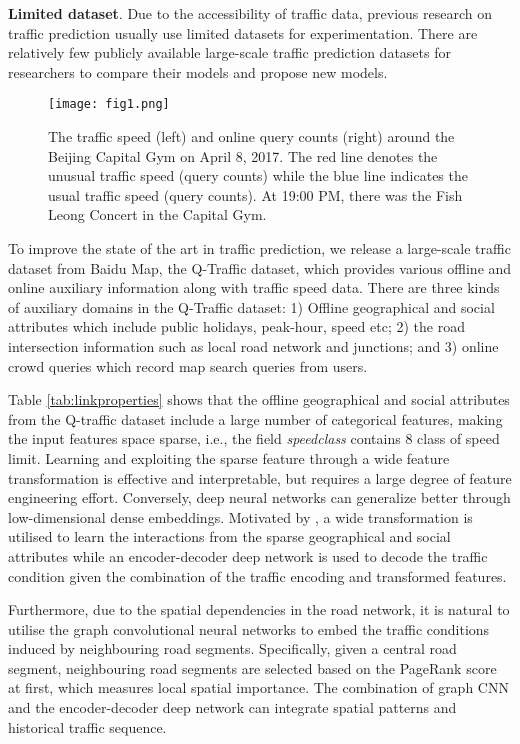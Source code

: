 \textbf{Limited dataset}. Due to the accessibility of traffic data, previous research on traffic prediction usually use limited datasets for experimentation. There are relatively few publicly available large-scale traffic prediction datasets for researchers to compare their models and propose new models.

\begin{figure}[htbp]
\centering
\texttt{[image: fig1.png]}
\caption{The traffic speed (left) and online query counts (right) around the Beijing Capital Gym on April 8, 2017. The red line denotes the unusual traffic speed (query counts) while the blue line indicates the usual traffic speed (query counts). At 19:00 PM, there was the Fish Leong Concert in the Capital Gym.}
\label{fig:querytraffic}
\end{figure}

To improve the state of the art in traffic prediction, we release a large-scale traffic dataset from Baidu Map, the Q-Traffic dataset, which provides various offline and online auxiliary information along with traffic speed data. There are three kinds of auxiliary domains in the Q-Traffic dataset: 1) Offline geographical and social attributes which include public holidays, peak-hour, speed etc; 2) the road intersection information such as local road network and junctions; and 3) online crowd queries which record map search queries from users. 

Table \ref{tab:linkproperties} shows that the offline geographical and social attributes from the Q-traffic dataset include a large number of categorical features, making the input features space sparse, i.e., the field \textit{speedclass} contains 8 class of speed limit. Learning and exploiting the sparse feature through a wide feature transformation is effective and interpretable, but requires a large degree of feature engineering effort. Conversely, deep neural networks can generalize better through low-dimensional dense embeddings. Motivated by \cite{cheng2016wide}, a wide transformation is utilised to learn the interactions from the sparse geographical and social attributes while an encoder-decoder deep network is used to decode the traffic condition given the combination of the traffic encoding and transformed features. 

Furthermore, due to the spatial dependencies in the road network, it is natural to utilise the graph convolutional neural networks \cite{niepert2016learning} to embed the traffic conditions induced by neighbouring road segments. Specifically, given a central road segment, neighbouring road segments are selected based on the PageRank score \cite{page1999pagerank} at first, which measures local spatial importance. The combination of graph CNN and the encoder-decoder deep network can integrate spatial patterns and historical traffic sequence.

